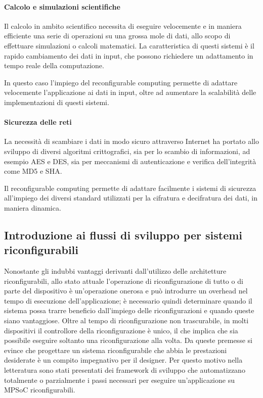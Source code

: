 \paragraph{Calcolo e simulazioni scientifiche}
Il calcolo in ambito scientifico necessita di eseguire velocemente e in maniera efficiente
una serie di operazioni su una grossa mole di dati, allo scopo di effettuare simulazioni o
calcoli matematici. La caratteristica di questi sistemi è il rapido cambiamento dei dati in
input, che possono richiedere un adattamento in tempo reale della computazione.

In questo caso l'impiego del reconfigurable computing permette di adattare velocemente
l'applicazione ai dati in input, oltre ad aumentare la scalabilità delle implementazioni
di questi sistemi.


\paragraph{Sicurezza delle reti}
La necessità di scambiare i dati in modo sicuro attraverso Internet ha portato allo sviluppo
di diversi algoritmi crittografici, sia per lo scambio di informazioni, ad esempio
\ac{AES} e \ac{DES}, sia per meccanismi di autenticazione e verifica dell'integrità come
MD5 e \ac{SHA}.

Il reconfigurable computing permette di adattare facilmente i sistemi di sicurezza
all'impiego dei diversi standard utilizzati per la cifratura e decifratura dei dati, in
maniera dinamica.


\subsection{Introduzione ai flussi di sviluppo per sistemi riconfigurabili}
\label{subsec:introFlussi}
Nonostante gli indubbi vantaggi derivanti dall'utilizzo delle architetture riconfigurabili,
allo stato attuale l'operazione di riconfigurazione di tutto o di parte del dispositivo \`e
un'operazione onerosa e pu\`o introdurre un overhead nel tempo di esecuzione dell'applicazione;
\`e necessario quindi determinare quando il sistema possa trarre beneficio dall'impiego delle
riconfigurazioni e quando queste siano vantaggiose. Oltre al tempo di riconfigurazione non trascurabile,
in molti dispositivi il controllore della riconfigurazione \`e unico, il che implica che sia possibile
eseguire soltanto una riconfigurazione alla volta.
Da queste premesse si evince che progettare un sistema riconfigurabile che abbia le prestazioni desiderate
\`e un compito impegnativo per il designer. Per questo motivo nella letteratura sono stati presentati dei framework
di sviluppo che automatizzano totalmente o parzialmente i passi necessari per eseguire un'applicazione
su MPSoC riconfigurabili.


